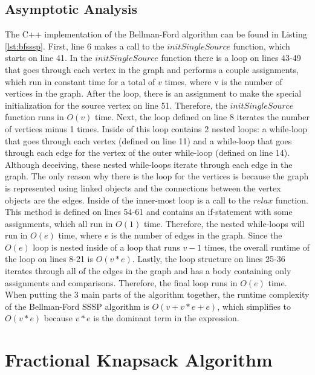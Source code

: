 \documentclass[letterpaper, 10pt,DIV=13]{scrartcl}
\numberwithin{equation}{section} %
\numberwithin{figure}{section} %
\numberwithin{table}{section} %
\begin{document}
\subsection{Asymptotic Analysis}
The C++ implementation of the Bellman-Ford algorithm can be found in Listing \ref{lst:bfsssp}. First, line 6 makes a call to the $initSingleSource$ function, which starts on line 41. In the $initSingleSource$ function there is a loop on lines 43-49 that goes through each vertex in the graph and performs a couple assignments, which run in constant time for a total of $v$ times, where v is the number of vertices in the graph. After the loop, there is an assignment to make the special initialization for the source vertex on line 51. Therefore, the $initSingleSource$ function runs in $O(v)$ time. Next, the loop defined on line 8 iterates the number of vertices minus 1 times. Inside of this loop contains 2 nested loops: a while-loop that goes through each vertex (defined on line 11) and a while-loop that goes through each edge for the vertex of the outer while-loop (defined on line 14). Although deceiving, these nested while-loops iterate through each edge in the graph. The only reason why there is the loop for the vertices is because the graph is represented using linked objects and the connections between the vertex objects are the edges. Inside of the inner-most loop is a call to the $relax$ function. This method is defined on lines 54-61 and contains an if-statement with some assignments, which all run in $O(1)$ time. Therefore, the nested while-loops will run in $O(e)$ time, where $e$ is the number of edges in the graph. Since the $O(e)$ loop is nested inside of a loop that runs $v - 1$ times, the overall runtime of the loop on lines 8-21 is $O(v * e)$. Lastly, the loop structure on lines 25-36 iterates through all of the edges in the graph and has a body containing only assignments and comparisons. Therefore, the final loop runs in $O(e)$ time. When putting the 3 main parts of the algorithm together, the runtime complexity of the Bellman-Ford SSSP algorithm is $O(v + v * e + e)$, which simplifies to $O(v * e)$ because $v * e$ is the dominant term in the expression.

\section{Fractional Knapsack Algorithm}
\end{document}
